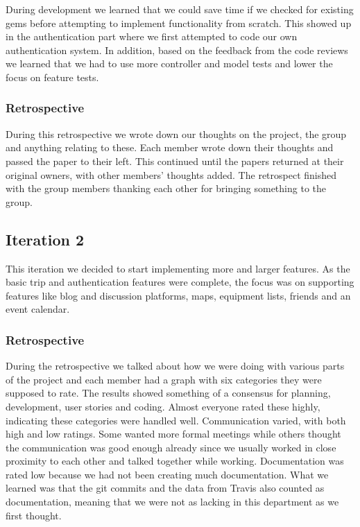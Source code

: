 \documentclass[a4paper]{article}
\begin{document}
\noindent
During development we learned that we could save time if we checked for existing gems before attempting to implement functionality from scratch. This showed up in the authentication part where we first attempted to code our own authentication system. In addition, based on the feedback from the code reviews we learned that we had to use more controller and model tests and lower the focus on feature tests.

\subsubsection{Retrospective}
During this retrospective we wrote down our thoughts on the project, the group and anything relating to these. Each member wrote down their thoughts and passed the paper to their left. This continued until the papers returned at their original owners, with other members' thoughts added. The retrospect finished with the group members thanking each other for bringing something to the group.

\subsection{Iteration 2}
This iteration we decided to start implementing more and larger features. As the basic trip and authentication features were complete, the focus was on supporting features like blog and discussion platforms, maps, equipment lists, friends and an event calendar.

\subsubsection{Retrospective}
During the retrospective we talked about how we were doing with various parts of the project and each member had a graph with six categories they were supposed to rate. The results showed something of a consensus for planning, development, user stories and coding. Almost everyone rated these highly, indicating these categories were handled well. Communication varied, with both high and low ratings. Some wanted more formal meetings while others thought the communication was good enough already since we usually worked in close proximity to each other and talked together while working. Documentation was rated low because we had not been creating much documentation. What we learned was that the git commits and the data from Travis also counted as documentation, meaning that we were not as lacking in this department as we first thought.
\end{document}
